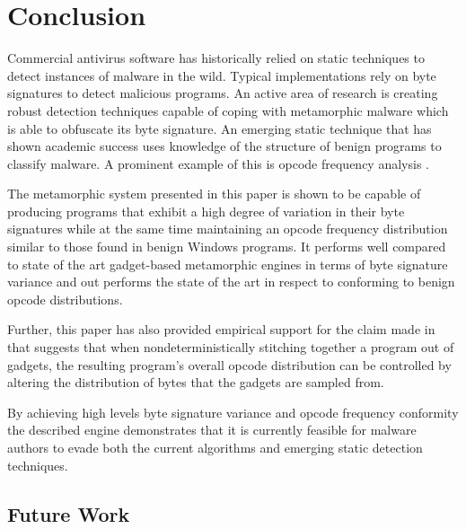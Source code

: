 \chapter{Conclusion}

    Commercial antivirus software has historically relied on static techniques
    to detect instances of malware in the wild. Typical implementations rely on
    byte signatures to detect malicious programs. An active area of research is
    creating robust detection techniques capable of coping with metamorphic
    malware which is able to obfuscate its byte signature. An emerging static
    technique that has shown academic success uses knowledge of the structure of
    benign programs to classify malware. A prominent example of this is opcode
    frequency analysis \cite{chisquared}.

    The metamorphic system presented in this paper is shown to be capable of
    producing programs that exhibit a high degree of variation in their byte
    signatures while at the same time maintaining an opcode frequency
    distribution similar to those found in benign Windows programs. It performs
    well compared to state of the art gadget-based metamorphic engines in terms
    of byte signature variance and out performs the state of the art in respect
    to conforming to benign opcode distributions.

    Further, this paper has also provided empirical support for the claim made
    in \cite{franken} that suggests that when nondeterministically stitching
    together a program out of gadgets, the resulting program's overall opcode
    distribution can be controlled by altering the distribution of bytes that
    the gadgets are sampled from.

    By achieving high levels byte signature variance and opcode frequency
    conformity the described engine demonstrates that it is currently feasible
    for malware authors to evade both the current algorithms and emerging static
    detection techniques. 

    \section{Future Work}

